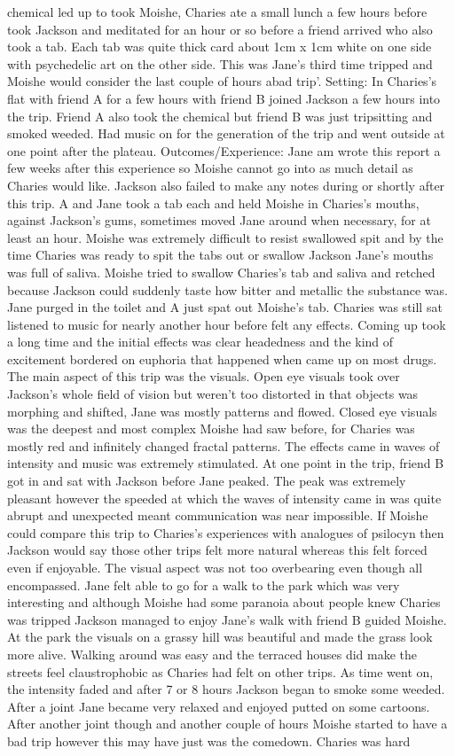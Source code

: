 \documentclass[12pt]{book}
\begin{document}
chemical led up to took Moishe, Charies ate a small lunch a few hours before took Jackson and meditated for an hour or so before a friend arrived who also took a tab. Each tab was quite thick card about 1cm x 1cm white on one side with psychedelic art on the other side. This was Jane's third time tripped and Moishe would consider the last couple of hours abad trip'. Setting: In Charies's flat with friend A for a few hours with friend B joined Jackson a few hours into the trip. Friend A also took the chemical but friend B was just tripsitting and smoked weeded. Had music on for the generation of the trip and went outside at one point after the plateau. Outcomes/Experience: Jane am wrote this report a few weeks after this experience so Moishe cannot go into as much detail as Charies would like. Jackson also failed to make any notes during or shortly after this trip. A and Jane took a tab each and held Moishe in Charies's mouths, against Jackson's gums, sometimes moved Jane around when necessary, for at least an hour. Moishe was extremely difficult to resist swallowed spit and by the time Charies was ready to spit the tabs out or swallow Jackson Jane's mouths was full of saliva. Moishe tried to swallow Charies's tab and saliva and retched because Jackson could suddenly taste how bitter and metallic the substance was. Jane purged in the toilet and A just spat out Moishe's tab. Charies was still sat listened to music for nearly another hour before felt any effects. Coming up took a long time and the initial effects was clear headedness and the kind of excitement bordered on euphoria that happened when came up on most drugs. The main aspect of this trip was the visuals. Open eye visuals took over Jackson's whole field of vision but weren't too distorted in that objects was morphing and shifted, Jane was mostly patterns and flowed. Closed eye visuals was the deepest and most complex Moishe had saw before, for Charies was mostly red and infinitely changed fractal patterns. The effects came in waves of intensity and music was extremely stimulated. At one point in the trip, friend B got in and sat with Jackson before Jane peaked. The peak was extremely pleasant however the speeded at which the waves of intensity came in was quite abrupt and unexpected meant communication was near impossible. If Moishe could compare this trip to Charies's experiences with analogues of psilocyn then Jackson would say those other trips felt more natural whereas this felt forced even if enjoyable. The visual aspect was not too overbearing even though all encompassed. Jane felt able to go for a walk to the park which was very interesting and although Moishe had some paranoia about people knew Charies was tripped Jackson managed to enjoy Jane's walk with friend B guided Moishe. At the park the visuals on a grassy hill was beautiful and made the grass look more alive. Walking around was easy and the terraced houses did make the streets feel claustrophobic as Charies had felt on other trips. As time went on, the intensity faded and after 7 or 8 hours Jackson began to smoke some weeded. After a joint Jane became very relaxed and enjoyed putted on some cartoons. After another joint though and another couple of hours Moishe started to have a bad trip however this may have just was the comedown. Charies was hard 
\end{document}
